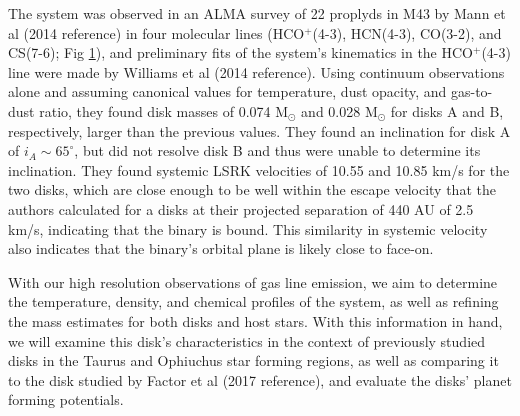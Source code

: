 The system was observed in an ALMA survey of 22 proplyds in M43 by Mann et al (2014 reference) in four molecular lines (HCO$^+$(4-3), HCN(4-3), CO(3-2), and CS(7-6); Fig \ref{fig:m1map}), and preliminary fits of the system's kinematics in the HCO$^+$(4-3) line were made by Williams et al (2014 reference). Using continuum observations alone and assuming canonical values for temperature, dust opacity, and gas-to-dust ratio, they found disk masses of 0.074 M$_{\odot}$ and 0.028 M$_{\odot}$ for disks A and B, respectively, larger than the previous values. They found an inclination for disk A of $i_A \sim 65^\circ$, but did not resolve disk B and thus were unable to determine its inclination. They found systemic LSRK velocities of 10.55 and 10.85 km/s for the two disks, which are close enough to be well within the escape velocity that the authors calculated for a disks at their projected separation of 440 AU of 2.5 km/s, indicating that the binary is bound. This similarity in systemic velocity also indicates that the binary's orbital plane is likely close to face-on.

\begin{figure}[htp]
  \hspace*{\fill}%
  \hfill%
  \hfill%
  \hfill%
  \hfill%
  \hspace*{\fill}%
  \label{fig:m1map}
\end{figure}

With our high resolution observations of gas line emission, we aim to determine the temperature, density, and chemical profiles of the system, as well as refining the mass estimates for both disks and host stars. With this information in hand, we will examine this disk's characteristics in the context of previously studied disks in the Taurus and Ophiuchus star forming regions, as well as comparing it to the disk studied by Factor et al (2017 reference), and evaluate the disks' planet forming potentials.






